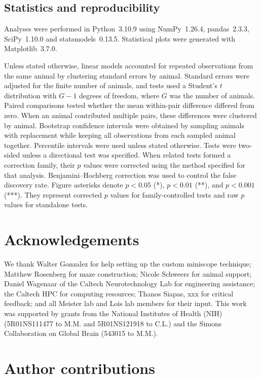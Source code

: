 \documentclass[fleqn,10pt]{wlscirep}
\begin{document}
\subsection*{Statistics and reproducibility}

Analyses were performed in Python~3.10.9 using NumPy~1.26.4, pandas~2.3.3, SciPy~1.10.0 and statsmodels~0.13.5. Statistical plots were generated with Matplotlib~3.7.0.

Unless stated otherwise, linear models accounted for repeated observations from the same animal by clustering standard errors by animal. Standard errors were adjusted for the finite number of animals, and tests used a Student's $t$ distribution with $G-1$ degrees of freedom, where $G$ was the number of animals. Paired comparisons tested whether the mean within-pair difference differed from zero. When an animal contributed multiple pairs, these differences were clustered by animal. Bootstrap confidence intervals were obtained by sampling animals with replacement while keeping all observations from each sampled animal together. Percentile intervals were used unless stated otherwise. Tests were two-sided unless a directional test was specified. When related tests formed a correction family, their $p$ values were corrected using the method specified for that analysis. Benjamini--Hochberg correction was used to control the false discovery rate. Figure asterisks denote $p<0.05$ (*), $p<0.01$ (**), and $p<0.001$ (***). They represent corrected $p$ values for family-controlled tests and raw $p$ values for standalone tests. 

\section*{Acknowledgements}

We thank Walter Gonzalez for help setting up the custom miniscope technique; Matthew Rosenberg for maze construction; Nicole Schweers for animal support; Daniel Wagenaar of the Caltech Neurotechnology Lab for engineering assistance; the Caltech HPC for computing resources; Thanos Siapas, xxx for critical feedback; and all Meister lab and Lois lab members for their input. This work was supported by grants from the National Institutes of Health (NIH) (5R01NS111477 to M.M. and 5R01NS121918 to C.L.) and the Simons Collaboration on Global Brain (543015 to M.M.).  

\section*{Author contributions}
\end{document}
